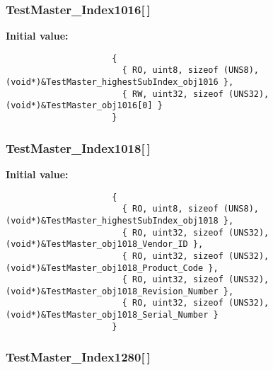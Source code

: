 \subsubsection{ {\bf Test\-Master\_\-Index1016}[$\,$]}\label{TestMasterMicroMod_2TestMaster_8c_24052245a9506091a0a4d2f019a971cd}


\textbf{Initial value:}

\begin{Code}\begin{verbatim} 
                     {
                       { RO, uint8, sizeof (UNS8), (void*)&TestMaster_highestSubIndex_obj1016 },
                       { RW, uint32, sizeof (UNS32), (void*)&TestMaster_obj1016[0] }
                     }
\end{verbatim}\end{Code}
\subsubsection{ {\bf Test\-Master\_\-Index1018}[$\,$]}\label{TestMasterMicroMod_2TestMaster_8c_721e7ebe982831cd8575c9a7e33f9ec0}


\textbf{Initial value:}

\begin{Code}\begin{verbatim} 
                     {
                       { RO, uint8, sizeof (UNS8), (void*)&TestMaster_highestSubIndex_obj1018 },
                       { RO, uint32, sizeof (UNS32), (void*)&TestMaster_obj1018_Vendor_ID },
                       { RO, uint32, sizeof (UNS32), (void*)&TestMaster_obj1018_Product_Code },
                       { RO, uint32, sizeof (UNS32), (void*)&TestMaster_obj1018_Revision_Number },
                       { RO, uint32, sizeof (UNS32), (void*)&TestMaster_obj1018_Serial_Number }
                     }
\end{verbatim}\end{Code}
\subsubsection{ {\bf Test\-Master\_\-Index1280}[$\,$]}\label{TestMasterMicroMod_2TestMaster_8c_b09e72d1ae2e37cd027cf126f8e7e541}


